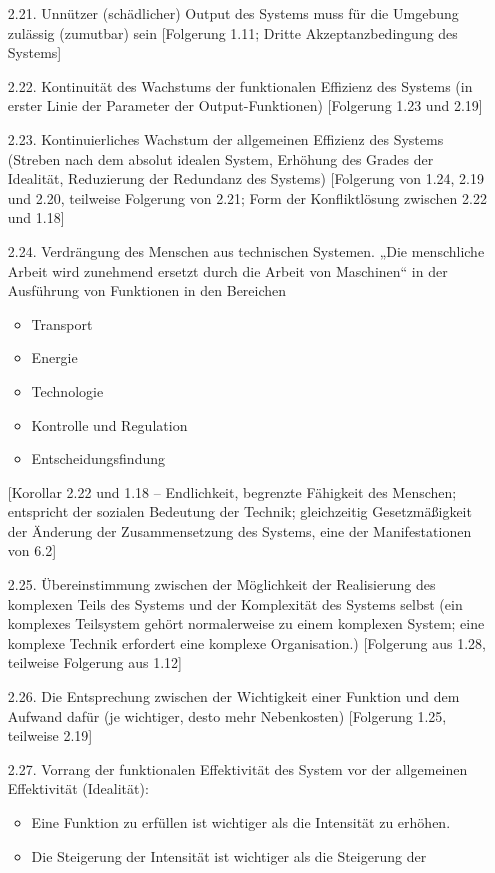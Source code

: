 \documentclass[11pt,a4paper]{article}
\begin{document}
\begin{itemize}
\item[2.21.] Unnützer (schädlicher) Output des Systems muss für die Umgebung
  zulässig (zumutbar) sein [Folgerung 1.11; Dritte Akzeptanzbedingung des
    Systems]
\item[2.22.] Kontinuität des Wachstums der funktionalen Effizienz des Systems
  (in erster Linie der Parameter der Output-Funktionen) [Folgerung 1.23 und
  2.19]
\item[2.23.] Kontinuierliches Wachstum der allgemeinen Effizienz des Systems
  (Streben nach dem absolut idealen System, Erhöhung des Grades der Idealität,
  Reduzierung der Redundanz des Systems) [Folgerung von 1.24, 2.19 und 2.20,
    teilweise Folgerung von 2.21; Form der Konfliktlösung zwischen 2.22 und
    1.18]
\item[2.24.] Verdrängung des Menschen aus technischen Systemen. „Die
  menschliche Arbeit wird zunehmend ersetzt durch die Arbeit von Maschinen“ in
  der Ausführung von Funktionen in den Bereichen
  \begin{itemize}
  \item Transport
  \item Energie
  \item Technologie
  \item Kontrolle und Regulation
  \item Entscheidungsfindung
  \end{itemize}
[Korollar 2.22 und 1.18 -- Endlichkeit, begrenzte Fähigkeit des Menschen;
  entspricht der sozialen Bedeutung der Technik; gleichzeitig Gesetzmäßigkeit
  der Änderung der Zusammensetzung des Systems, eine der Manifestationen von
  6.2]
\item[2.25.] Übereinstimmung zwischen der Möglichkeit der Realisierung des
  komplexen Teils des Systems und der Komplexität des Systems selbst (ein
  komplexes Teilsystem gehört normalerweise zu einem komplexen System; eine
  komplexe Technik erfordert eine komplexe Organisation.)  [Folgerung aus
    1.28, teilweise Folgerung aus 1.12]
\item[2.26.] Die Entsprechung zwischen der Wichtigkeit einer Funktion und dem
  Aufwand dafür (je wichtiger, desto mehr Nebenkosten) [Folgerung 1.25,
    teilweise 2.19]
\item[2.27.] Vorrang der funktionalen Effektivität des System vor der
  allgemeinen Effektivität (Idealität): 
  \begin{itemize}
  \item Eine Funktion zu erfüllen ist wichtiger als die Intensität zu erhöhen.
  \item Die Steigerung der Intensität ist wichtiger als die Steigerung der

\end{itemize}
\end{itemize}
\end{document}

